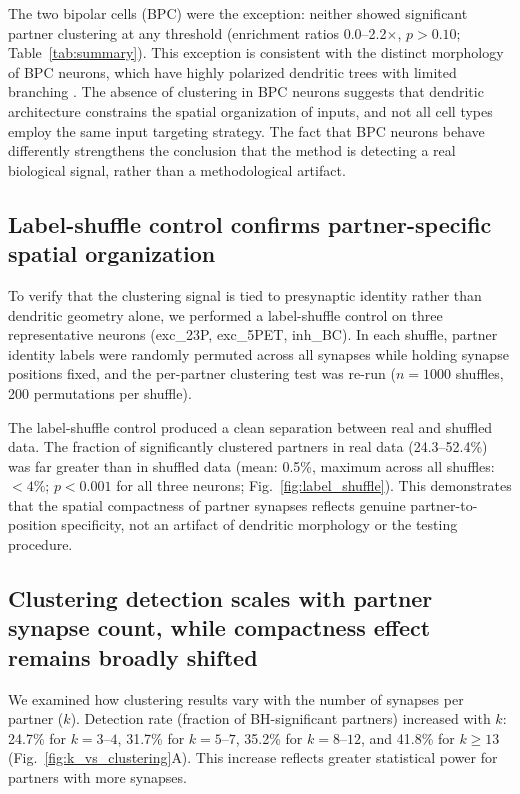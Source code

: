 The two bipolar cells (BPC) were the exception: neither showed significant partner clustering at any threshold (enrichment ratios 0.0--2.2$\times$, $p > 0.10$; Table~\ref{tab:summary}). This exception is consistent with the distinct morphology of BPC neurons, which have highly polarized dendritic trees with limited branching \citep{microns}. The absence of clustering in BPC neurons suggests that dendritic architecture constrains the spatial organization of inputs, and not all cell types employ the same input targeting strategy. The fact that BPC neurons behave differently strengthens the conclusion that the method is detecting a real biological signal, rather than a methodological artifact.

\subsection{Label-shuffle control confirms partner-specific spatial organization}

To verify that the clustering signal is tied to presynaptic identity rather than dendritic geometry alone, we performed a label-shuffle control on three representative neurons (exc\_23P, exc\_5PET, inh\_BC). In each shuffle, partner identity labels were randomly permuted across all synapses while holding synapse positions fixed, and the per-partner clustering test was re-run ($n = 1000$ shuffles, 200 permutations per shuffle).

The label-shuffle control produced a clean separation between real and shuffled data. The fraction of significantly clustered partners in real data (24.3--52.4\%) was far greater than in shuffled data (mean: 0.5\%, maximum across all shuffles: $< 4\%$; $p < 0.001$ for all three neurons; Fig.~\ref{fig:label_shuffle}). This demonstrates that the spatial compactness of partner synapses reflects genuine partner-to-position specificity, not an artifact of dendritic morphology or the testing procedure.

\subsection{Clustering detection scales with partner synapse count, while compactness effect remains broadly shifted}

We examined how clustering results vary with the number of synapses per partner ($k$). Detection rate (fraction of BH-significant partners) increased with $k$: 24.7\% for $k = 3$--$4$, 31.7\% for $k = 5$--$7$, 35.2\% for $k = 8$--$12$, and 41.8\% for $k \geq 13$ (Fig.~\ref{fig:k_vs_clustering}A). This increase reflects greater statistical power for partners with more synapses.

